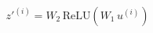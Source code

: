 \documentclass[preview]{standalone}
\begin{document}
\begin{align*}
z'^{(i)} = W_2\,\mathrm{ReLU}(W_1\,u^{(i)})
\end{align*}
\end{document}
